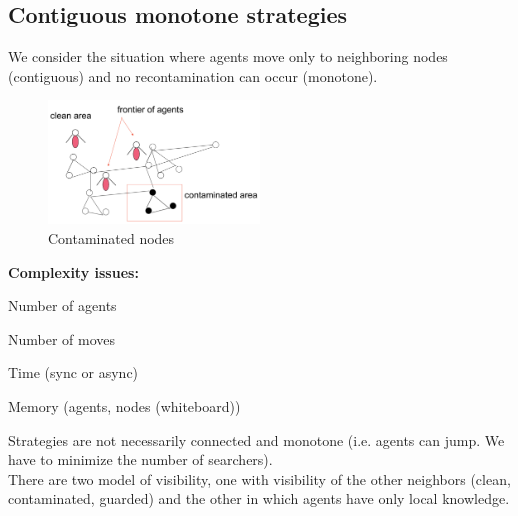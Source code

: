 \documentclass[paper=a4, fontsize=11pt]{scrartcl} %
\numberwithin{equation}{section} %
\numberwithin{figure}{section} %
\numberwithin{table}{section} %
\begin{document}
\clearpage

\subsection*{Contiguous monotone strategies}
We consider the situation where agents move only to neighboring nodes (contiguous) and no recontamination can occur (monotone).
\begin{figure}[H]
  \centering
  \includegraphics[width=0.5\textwidth]{img/cont_2.png}
  \caption{Contaminated nodes}
  
\end{figure}
\textbf{Complexity issues:}
\begin{compactitem}
\item Number of agents
\item Number of moves
\item Time (sync or async)
\item Memory (agents, nodes (whiteboard))
\end{compactitem}
Strategies are not necessarily connected and monotone (i.e. agents can jump. We have to minimize the number of searchers).\\
There are two model of visibility, one with visibility of the other neighbors (clean, contaminated, guarded) and the other in which agents have only local knowledge.
\end{document}
